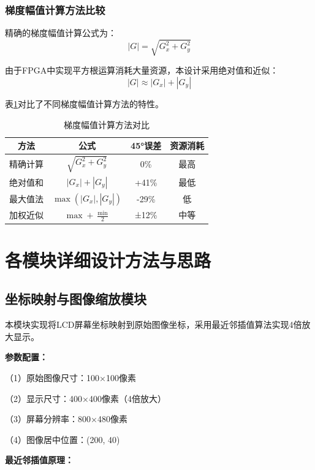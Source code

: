 \documentclass[12pt,hyperref,a4paper,UTF8]{ctexart}
\begin{document}
\subsubsection{梯度幅值计算方法比较}

精确的梯度幅值计算公式为：
\begin{equation}
|G| = \sqrt{G_x^2 + G_y^2}
\end{equation}

由于FPGA中实现平方根运算消耗大量资源，本设计采用绝对值和近似：
\begin{equation}
|G| \approx |G_x| + |G_y|
\end{equation}

表\ref{tab:gradient_compare}对比了不同梯度幅值计算方法的特性。

\begin{table}[H]
\centering
\caption{梯度幅值计算方法对比}
\label{tab:gradient_compare}
\begin{tabular}{cccc}
\toprule
\textbf{方法} & \textbf{公式} & \textbf{45°误差} & \textbf{资源消耗} \\
\midrule
精确计算 & $\sqrt{G_x^2+G_y^2}$ & 0\% & 最高 \\
绝对值和 & $|G_x|+|G_y|$ & +41\% & 最低 \\
最大值法 & $\max(|G_x|,|G_y|)$ & -29\% & 低 \\
加权近似 & $\max + \frac{\min}{2}$ & ±12\% & 中等 \\
\bottomrule
\end{tabular}
\end{table}

\section{各模块详细设计方法与思路}

\subsection{坐标映射与图像缩放模块}

本模块实现将LCD屏幕坐标映射到原始图像坐标，采用最近邻插值算法实现4倍放大显示。

\textbf{参数配置：}

（1）原始图像尺寸：100×100像素

（2）显示尺寸：400×400像素（4倍放大）

（3）屏幕分辨率：800×480像素

（4）图像居中位置：(200, 40)

\textbf{最近邻插值原理：}
\end{document}

